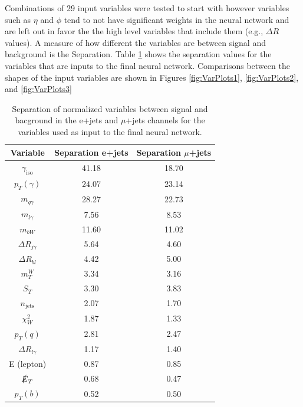 Combinations of 29 input variables were tested to start with however variables such as $\eta$ and $\phi$ tend to not have significant weights in the neural network and are left out in favor the the high level variables that include them (e.g., $\Delta R$ values).  A measure of how different the variables are between signal and background is the Separation.  Table \ref{tab:Separations} shows the separation values for the variables that are inputs to the final neural network.  Comparisons between the shapes of the input variables are shown in Figures \ref{fig:VarPlots1}, \ref{fig:VarPlots2}, and \ref{fig:VarPlots3}
\begin{table}[]
\begin{center}
{\renewcommand{\arraystretch}{1.2}
\begin{tabular}{ccc}
\hline
Variable  &  Separation e+jets   & Separation $\mu$+jets   \\  \hline 
$\gamma_{\text{iso}}$   &  41.18   &  18.70	\\   
$p_T (\gamma)$            &  24.07   & 23.14  	\\
$m_{q\gamma}$           &   28.27  &  22.73 	\\
$m_{l\gamma}$             &  7.56   &  8.53 	\\
$m_{bW} $                    &  11.60   & 11.02  	\\
$\Delta R_{j\gamma}$ &   5.64  &  4.60 	\\
$\Delta R_{b l}$            &   4.42  &  5.00 	\\
$m_{T}^{W}$              &   3.34  &  3.16 	\\
$S_T$                            &  3.30   &  3.83 	\\
$n_{\text{jets}}$         &  2.07   &  1.70 	\\
$\chi^{2}_{W}$           & 1.87    &  1.33 	\\
$p_T (q)$                      &  2.81    &  2.47	\\
$\Delta R_{l \gamma}$ &  1.17  &  1.40 	\\
E (lepton)                       &  0.87   & 0.85	\\	
$\slashed{E}_T  $          &  0.68   & 0.47 	\\
$p_T (b)$                       & 0.52    & 0.50	\\ \hline
\end{tabular}
}
\label{tab:Separations}
\caption{Separation of normalized variables between signal and bacground in the e+jets and $\mu$+jets channels for the variables used as input to the final neural network.  }
\end{center}
\end{table}


